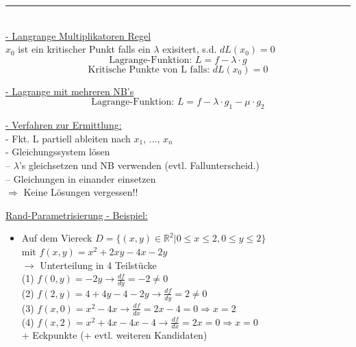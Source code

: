 \documentclass[6pt]{article}
\begin{document}
\begin{multicols*}{3}
	\vspace{-2mm}
  	\noindent\textcolor{gray}{\rule{9cm}{0.1pt}}
	\vspace{-2mm}\\

	\underline{- Langrange Multiplikatoren Regel} \vspace{1mm}\\
	$x_0$ ist ein kritischer Punkt falls ein $\lambda$ exisitert, s.d. $dL(x_0)=0$
			\[
					\text{Lagrange-Funktion: }L = f - \lambda \cdot g
			\]
			\[
					\text{Kritische Punkte von L falls: } dL(x_0) = 0
			\]
			
	\vspace{1mm}		
	\underline{- Lagrange mit mehreren NB's} \vspace{1mm}\\
			\[
					\text{Lagrange-Funktion: }L = f - \lambda \cdot g_1 - \mu \cdot g_2
			\]
			\vspace{1mm}
			
			\underline{- Verfahren zur Ermittlung:} \vspace{1mm}\\
			- Fkt. L partiell ableiten nach $x_1$, ..., $x_n$ \\
			- Gleichungssystem l{\"o}sen \\
			-- $\lambda$'s gleichsetzen und NB verwenden (evtl. Fallunterscheid.) \\
			-- Gleichungen in einander einsetzen \\
			$\Rightarrow$ Keine L{\"o}sungen vergessen!!

	
	
	\columnbreak
	\underline{Rand-Parametrisierung - Beispiel:}
	\begin{itemize}[leftmargin=*,align=left]
			\item 	Auf dem Viereck $ D = \{(x,y) \in \mathbb{R}^2| 0 \leq x \leq 2, 0 \leq y \leq 2 \}$	\\
						mit $f(x,y) = x^2 + 2xy - 4x - 2y$\vspace{1mm}\\
						$\rightarrow$ Unterteilung in 4 Teilst{\"u}cke \\
						(1) $f(0,y) = -2y \rightarrow \frac{df}{dy}=-2 \not = 0$ \\
						(2) $f(2,y) = 4 + 4y -4 -2y \rightarrow \frac{df}{dy}=2 \not = 0$ \\
						(3) $f(x,0) = x^2 -4x \rightarrow \frac{df}{dx}=2x -4 = 0 \Rightarrow x=2$\\
						(4) $f(x,2) = x^2 + 4x - 4x -4 \rightarrow \frac{df}{dx}=2x = 0 \Rightarrow x= 0$\\
						+ Eckpunkte (+ evtl. weiteren Kandidaten)
	\end{itemize}
	

\end{multicols*}
\end{document}
